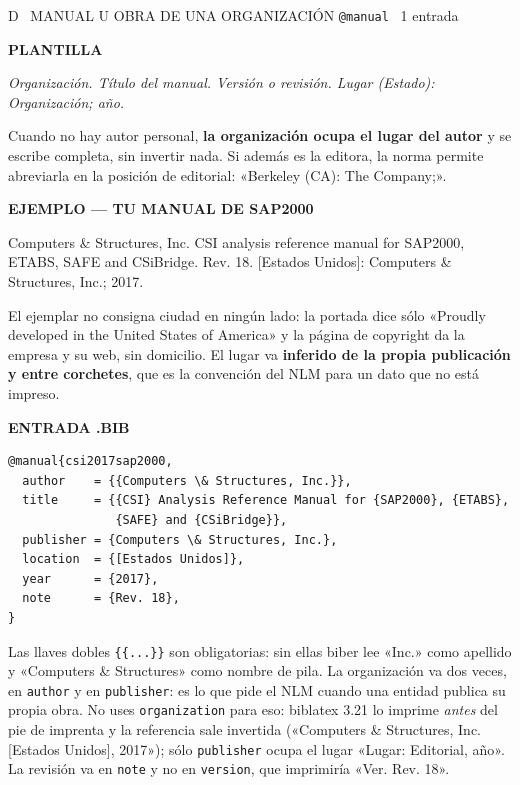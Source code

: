 \documentclass[11pt,a4paper]{article}
\newcommand{\rot}[1]{\vspace{2pt}\par{\footnotesize\bfseries\color{gris}\MakeUppercase{#1}}\par\vspace{1pt}}
\newcommand{\refv}[1]{\par{\small #1}\par}
\newcommand{\plantilla}[1]{\par{\small\itshape\color{tinta} #1}\par}
\newcommand{\anot}[1]{{\color{gris}\footnotesize #1}}
\begin{document}
\begin{ficha}{D \textperiodcentered\ MANUAL U OBRA DE UNA ORGANIZACIÓN \hfill \normalfont\texttt{@manual} \textperiodcentered\ 1 entrada}
\rot{plantilla}
\plantilla{Organización. Título del manual. Versión o revisión. Lugar (Estado): Organización;
año.}
\anot{Cuando no hay autor personal, \textbf{la organización ocupa el lugar del autor} y se
escribe completa, sin invertir nada. Si además es la editora, la norma permite abreviarla en
la posición de editorial: «Berkeley (CA): The Company;».}

\rot{ejemplo --- tu manual de SAP2000}
\refv{Computers \& Structures, Inc. CSI analysis reference manual for SAP2000, ETABS, SAFE and
CSiBridge. Rev. 18. [Estados Unidos]: Computers \& Structures, Inc.; 2017.}
\anot{El ejemplar no consigna ciudad en ningún lado: la portada dice sólo «Proudly developed
in the United States of America» y la página de copyright da la empresa y su web, sin
domicilio. El lugar va \textbf{inferido de la propia publicación y entre corchetes}, que es
la convención del NLM para un dato que no está impreso.}

\rot{entrada .bib}
\begin{Verbatim}[fontsize=\small,xleftmargin=4pt]
@manual{csi2017sap2000,
  author    = {{Computers \& Structures, Inc.}},
  title     = {{CSI} Analysis Reference Manual for {SAP2000}, {ETABS},
               {SAFE} and {CSiBridge}},
  publisher = {Computers \& Structures, Inc.},
  location  = {[Estados Unidos]},
  year      = {2017},
  note      = {Rev. 18},
}
\end{Verbatim}
\anot{Las llaves dobles \texttt{\{\{...\}\}} son obligatorias: sin ellas biber lee «Inc.» como
apellido y «Computers \& Structures» como nombre de pila. La organización va dos veces, en
\texttt{author} y en \texttt{publisher}: es lo que pide el NLM cuando una entidad publica su
propia obra. No uses \texttt{organization} para eso: biblatex 3.21 lo imprime \emph{antes} del
pie de imprenta y la referencia sale invertida («Computers \& Structures, Inc. [Estados
Unidos], 2017»); sólo \texttt{publisher} ocupa el lugar «Lugar: Editorial, año». La revisión
va en \texttt{note} y no en \texttt{version}, que imprimiría «Ver. Rev. 18».}
\end{ficha}
\end{document}
